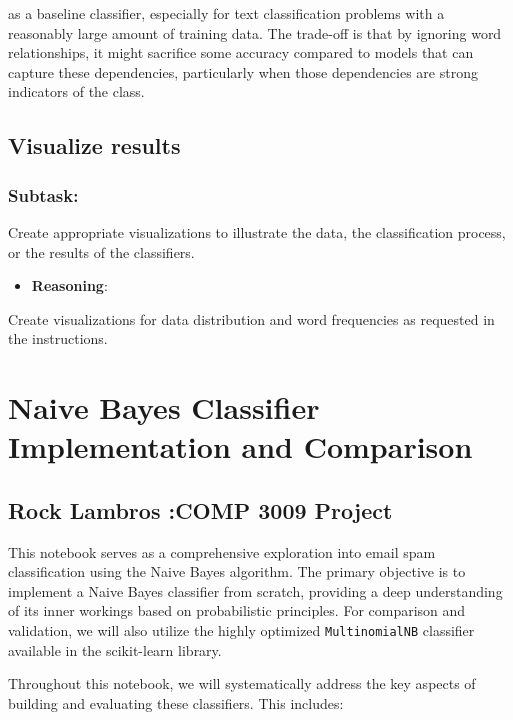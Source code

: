 \documentclass[12pt,a4paper]{article}
\begin{document}
     as a baseline classifier, especially for text classification problems with a reasonably large amount of training data.
   The trade-off is that by ignoring word relationships, it might sacrifice some accuracy compared to models
   that can capture these dependencies, particularly when those dependencies are strong indicators of the class.



\subsection{Visualize results}

\subsubsection{Subtask:}
Create appropriate visualizations to illustrate the data, the classification process, or the results of the classifiers.


\begin{itemize}
    \item \textbf{Reasoning}:
\end{itemize}

Create visualizations for data distribution and word frequencies as requested in the instructions.



\section{Naive Bayes Classifier Implementation and Comparison}

\subsection{Rock Lambros :COMP 3009 Project}

This notebook serves as a comprehensive exploration into email spam classification using the Naive Bayes algorithm. The primary objective is to implement a Naive Bayes classifier from scratch, providing a deep understanding of its inner workings based on probabilistic principles. For comparison and validation, we will also utilize the highly optimized \texttt{MultinomialNB} classifier available in the scikit-learn library.

Throughout this notebook, we will systematically address the key aspects of building and evaluating these classifiers. This includes:
\end{document}
